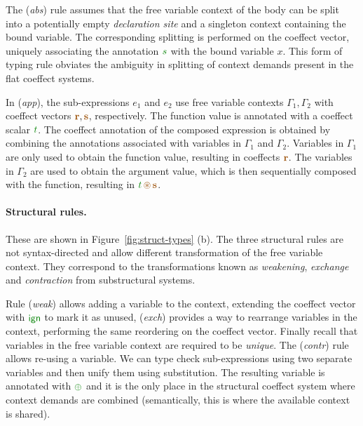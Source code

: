 The (\emph{abs}) rule assumes that the free variable context of the body can be split into
a potentially empty \emph{declaration site} and a singleton context containing the bound
variable. The corresponding splitting is performed on the coeffect vector, uniquely associating
the annotation $\cclrd{s}$ with the bound variable $x$. This form of typing rule obviates the
ambiguity in splitting of context demands present in the flat coeffect systems.

In (\emph{app}), the sub-expressions $e_1$ and $e_2$ use free variable contexts $\Gamma_1, \Gamma_2$
with coeffect vectors $\aclrd{\textbf{r}}, \aclrd{\textbf{s}}$, respectively. The function
value is annotated with a coeffect scalar $\cclrd{t}$.
The coeffect annotation of the composed expression is obtained by combining the annotations
associated with variables in $\Gamma_1$ and $\Gamma_2$. Variables in $\Gamma_1$ are only
used to obtain the function value, resulting in coeffects $\aclrd{\textbf{r}}$. The
variables in $\Gamma_2$ are used to obtain the argument value, which is then sequentially
composed with the function, resulting in $\cclrd{t}\,\aseq\,\aclrd{\textbf{s}}$.

\paragraph{Structural rules.}
These are shown in Figure~\ref{fig:struct-types} (b). The three structural rules are not
syntax-directed and allow different transformation of the free variable context. They correspond
to the transformations known as \emph{weakening}, \emph{exchange} and \emph{contraction}
from substructural systems.

Rule (\emph{weak}) allows adding a variable to the context, extending the coeffect
vector with $\czero$ to mark it as unused, (\emph{exch}) provides a way to rearrange variables
in the context, performing the same reordering on the coeffect vector. Finally recall that
variables in the free variable context are required to be \emph{unique}. The (\emph{contr}) rule
allows re-using a variable. We can type check sub-expressions using two separate variables and
then unify them using substitution. The resulting variable is annotated with $\cpar$ and it
is the only place in the structural coeffect system where context demands are combined
(semantically, this is where the available context is shared).


